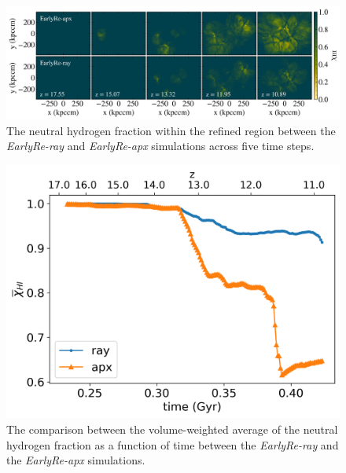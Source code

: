 \documentclass[linenumbers, twocolumn]{aastex631}
\begin{document}
\begin{figure}
	\centering
	\includegraphics[width=\textwidth]{EarlyRe/neutralHfraction_comparison_multiple.png}
	\caption{The neutral hydrogen fraction within the refined region between the \textit{EarlyRe-ray} and \textit{EarlyRe-apx} simulations across five time steps.}
	\label{fig:neutralHfrac_map}
\end{figure}

\begin{figure}
	\centering
	\includegraphics[width=0.95\columnwidth]{EarlyRe/neutralHfraction_evolution.png}
	\caption{The comparison between the volume-weighted average of the neutral hydrogen fraction as a function of time between the \textit{EarlyRe-ray} and the \textit{EarlyRe-apx} simulations.}
	\label{fig:neutralHfrac_evolution}
\end{figure}
\end{document}
